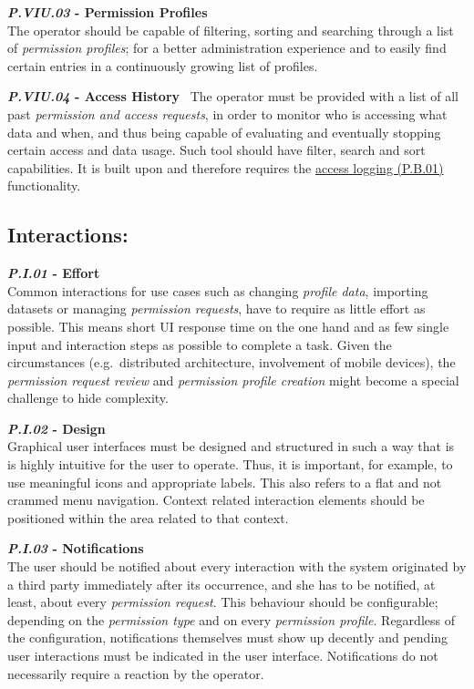 \documentclass[12pt,english,a4paper,titlepage,cleardoublepage=empty,dottedtoc]{report}
\begin{document}
\textbf{\emph{\protect\hypertarget{pviu03}{}{P.VIU.03}} - Permission
Profiles}\\
The operator should be capable of filtering, sorting and searching
through a list of \emph{permission profiles}; for a better
administration experience and to easily find certain entries in a
continuously growing list of profiles.

\textbf{\emph{\protect\hypertarget{pviu04}{}{P.VIU.04}} - Access
History}~ The operator must be provided with a list of all past
\emph{permission and access requests}, in order to monitor who is
accessing what data and when, and thus being capable of evaluating and
eventually stopping certain access and data usage. Such tool should have
filter, search and sort capabilities. It is built upon and therefore
requires the \protect\hyperlink{pb01}{access logging (P.B.01)}
functionality.

\subsection*{Interactions:}\label{interactions}

\textbf{\emph{\protect\hypertarget{pi01}{}{P.I.01}} - Effort}\\
Common interactions for use cases such as changing \emph{profile data},
importing datasets or managing \emph{permission requests}, have to
require as little effort as possible. This means short UI response time
on the one hand and as few single input and interaction steps as
possible to complete a task. Given the circumstances (e.g.~distributed
architecture, involvement of mobile devices), the \emph{permission
request review} and \emph{permission profile creation} might become a
special challenge to hide complexity.

\textbf{\emph{\protect\hypertarget{pi02}{}{P.I.02}} - Design}\\
Graphical user interfaces must be designed and structured in such a way
that is is highly intuitive for the user to operate. Thus, it is
important, for example, to use meaningful icons and appropriate labels.
This also refers to a flat and not crammed menu navigation. Context
related interaction elements should be positioned within the area
related to that context.

\newpage

\textbf{\emph{\protect\hypertarget{pi03}{}{P.I.03}} - Notifications}\\
The user should be notified about every interaction with the system
originated by a third party immediately after its occurrence, and she
has to be notified, at least, about every \emph{permission request}.
This behaviour should be configurable; depending on the \emph{permission
type} and on every \emph{permission profile}. Regardless of the
configuration, notifications themselves must show up decently and
pending user interactions must be indicated in the user interface.
Notifications do not necessarily require a reaction by the operator.
\end{document}
